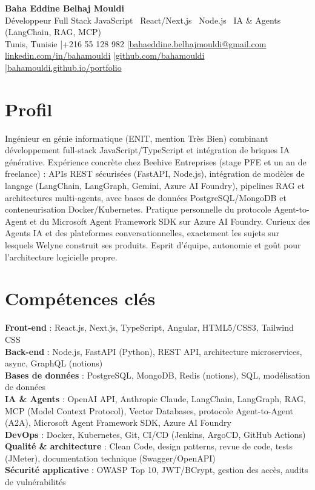 \documentclass[a4paper,9pt]{article}
\begin{document}
\begin{center}
{\LARGE\bfseries\color{navy} Baha Eddine Belhaj Mouldi}\\[2pt]
{\normalsize\color{navy} Développeur Full Stack JavaScript \textbar\ React/Next.js \textbar\ Node.js \textbar\ IA \& Agents (LangChain, RAG, MCP)}\\[3pt]
{\small Tunis, Tunisie \quad|\quad +216 55 128 982 \quad|\quad \href{mailto:bahaeddine.belhajmouldi@gmail.com}{bahaeddine.belhajmouldi@gmail.com}}\\[1pt]
{\small \href{https://www.linkedin.com/in/bahamouldi}{linkedin.com/in/bahamouldi} \quad|\quad \href{https://github.com/bahamouldi}{github.com/bahamouldi} \quad|\quad \href{https://bahamouldi.github.io/portfolio/}{bahamouldi.github.io/portfolio}}
\end{center}
\vspace{1pt}
\section{Profil}
Ingénieur en génie informatique (ENIT, mention Très Bien) combinant développement full-stack JavaScript/TypeScript et intégration de briques IA générative. Expérience concrète chez Beehive Entreprises (stage PFE et un an de freelance) : APIs REST sécurisées (FastAPI, Node.js), intégration de modèles de langage (LangChain, LangGraph, Gemini, Azure AI Foundry), pipelines RAG et architectures multi-agents, avec bases de données PostgreSQL/MongoDB et conteneurisation Docker/Kubernetes. Pratique personnelle du protocole Agent-to-Agent et du Microsoft Agent Framework SDK sur Azure AI Foundry. Curieux des Agents IA et des plateformes conversationnelles, exactement les sujets sur lesquels Welyne construit ses produits. Esprit d'équipe, autonomie et goût pour l'architecture logicielle propre.
\section{Compétences clés}
\textbf{Front-end} : React.js, Next.js, TypeScript, Angular, HTML5/CSS3, Tailwind CSS\\[0.3pt]
\textbf{Back-end} : Node.js, FastAPI (Python), REST API, architecture microservices, async, GraphQL (notions)\\[0.3pt]
\textbf{Bases de données} : PostgreSQL, MongoDB, Redis (notions), SQL, modélisation de données\\[0.3pt]
\textbf{IA \& Agents} : OpenAI API, Anthropic Claude, LangChain, LangGraph, RAG, MCP (Model Context Protocol), Vector Databases, protocole Agent-to-Agent (A2A), Microsoft Agent Framework SDK, Azure AI Foundry\\[0.3pt]
\textbf{DevOps} : Docker, Kubernetes, Git, CI/CD (Jenkins, ArgoCD, GitHub Actions)\\[0.3pt]
\textbf{Qualité \& architecture} : Clean Code, design patterns, revue de code, tests (JMeter), documentation technique (Swagger/OpenAPI)\\[0.3pt]
\textbf{Sécurité applicative} : OWASP Top 10, JWT/BCrypt, gestion des accès, audits de vulnérabilités
\end{document}
